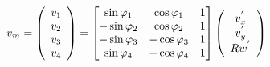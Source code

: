 \documentclass[twocolumn,10pt]{amrob}
\begin{document}
\begin{equation}
  v_m = 
    \left(\begin{array}{c}
      v_1 \\ v_2 \\ v_3 \\ v_4 
    \end{array}\right)
    = 
    \begin{bmatrix}
      \sin\varphi_1 & \cos\varphi_1 & 1 \\
      -\sin\varphi_2 & \cos\varphi_2 & 1 \\
      -\sin\varphi_3 & -\cos\varphi_3 & 1 \\
      \sin\varphi_4 & -\cos\varphi_4 & 1 \\
    \end{bmatrix}
    \left(\begin{array}{c}
      v_x^{'}  \\ v_y^{'}  \\ {Rw}^{'} 
    \end{array} \right) \label{eq:velsMots} \\
\end{equation}
\par


\end{document}
